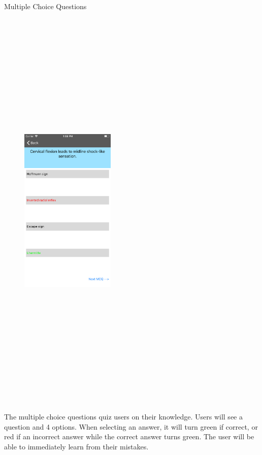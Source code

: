 \documentclass[final]{beamer}
\newlength{\onecolwid}
\begin{document}
\begin{frame}[t]
\begin{columns}[t]
\begin{column}{\onecolwid}
\begin{block}{\LARGE Multiple Choice Questions}

\begin{figure}
\centering
\includegraphics[width=0.4\textwidth, height=20cm]{mcq.png}

\end{figure}
\large
The multiple choice questions quiz users on their knowledge. Users will see a question and 4 options. When selecting an answer, it will turn green if correct, or red if an incorrect answer while the correct answer turns green. The user will be able to immediately learn from their mistakes.


\end{block}
\end{column}
\end{columns}
\end{frame}
\end{document}
